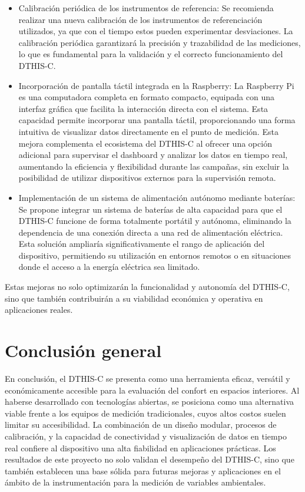 \documentclass[
  letterpaper,
]{scrbook}
\begin{document}
\begin{itemize}
\item
  Calibración periódica de los instrumentos de referencia: Se recomienda
  realizar una nueva calibración de los instrumentos de referenciación
  utilizados, ya que con el tiempo estos pueden experimentar
  desviaciones. La calibración periódica garantizará la precisión y
  trazabilidad de las mediciones, lo que es fundamental para la
  validación y el correcto funcionamiento del DTHIS-C.
\item
  Incorporación de pantalla táctil integrada en la Raspberry: La
  Raspberry Pi es una computadora completa en formato compacto, equipada
  con una interfaz gráfica que facilita la interacción directa con el
  sistema. Esta capacidad permite incorporar una pantalla táctil,
  proporcionando una forma intuitiva de visualizar datos directamente en
  el punto de medición. Esta mejora complementa el ecosistema del
  DTHIS-C al ofrecer una opción adicional para supervisar el dashboard y
  analizar los datos en tiempo real, aumentando la eficiencia y
  flexibilidad durante las campañas, sin excluir la posibilidad de
  utilizar dispositivos externos para la supervisión remota.
\item
  Implementación de un sistema de alimentación autónomo mediante
  baterías: Se propone integrar un sistema de baterías de alta capacidad
  para que el DTHIS-C funcione de forma totalmente portátil y autónoma,
  eliminando la dependencia de una conexión directa a una red de
  alimentación eléctrica. Esta solución ampliaría significativamente el
  rango de aplicación del dispositivo, permitiendo su utilización en
  entornos remotos o en situaciones donde el acceso a la energía
  eléctrica sea limitado.
\end{itemize}

Estas mejoras no solo optimizarán la funcionalidad y autonomía del
DTHIS-C, sino que también contribuirán a su viabilidad económica y
operativa en aplicaciones reales.

\section{Conclusión general}\label{conclusiuxf3n-general}

En conclusión, el DTHIS-C se presenta como una herramienta eficaz,
versátil y económicamente accesible para la evaluación del confort en
espacios interiores. Al haberse desarrollado con tecnologías abiertas,
se posiciona como una alternativa viable frente a los equipos de
medición tradicionales, cuyos altos costos suelen limitar su
accesibilidad. La combinación de un diseño modular, procesos de
calibración, y la capacidad de conectividad y visualización de datos en
tiempo real confiere al dispositivo una alta fiabilidad en aplicaciones
prácticas. Los resultados de este proyecto no solo validan el desempeño
del DTHIS-C, sino que también establecen una base sólida para futuras
mejoras y aplicaciones en el ámbito de la instrumentación para la
medición de variables ambientales.
\end{document}
